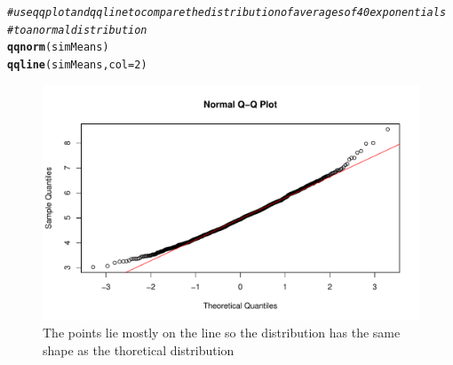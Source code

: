 \documentclass{article}\usepackage[]{graphicx}\usepackage[]{color}
\makeatletter
\def\maxwidth{ %
  \ifdim\Gin@nat@width>\linewidth
    \linewidth
  \else
    \Gin@nat@width
  \fi
}
\newcommand{\hlnum}[1]{\textcolor[rgb]{0.686,0.059,0.569}{#1}}%
\newcommand{\hlcom}[1]{\textcolor[rgb]{0.678,0.584,0.686}{\textit{#1}}}%
\newcommand{\hlstd}[1]{\textcolor[rgb]{0.345,0.345,0.345}{#1}}%
\newcommand{\hlkwc}[1]{\textcolor[rgb]{0.333,0.667,0.333}{#1}}%
\newcommand{\hlkwd}[1]{\textcolor[rgb]{0.737,0.353,0.396}{\textbf{#1}}}%
\newenvironment{kframe}{%
 \def\at@end@of@kframe{}%
 \ifinner\ifhmode%
  \def\at@end@of@kframe{\end{minipage}}%
  \begin{minipage}{\columnwidth}%
 \fi\fi%
 \def\FrameCommand##1{\hskip\@totalleftmargin \hskip-\fboxsep
 \colorbox{shadecolor}{##1}\hskip-\fboxsep
     \hskip-\linewidth \hskip-\@totalleftmargin \hskip\columnwidth}%
 \MakeFramed {\advance\hsize-\width
   \@totalleftmargin\z@ \linewidth\hsize
   \@setminipage}}%
 {\par\unskip\endMakeFramed%
 \at@end@of@kframe}
\newenvironment{knitrout}{}{} %
\makeatother
\begin{document}
\begin{knitrout}
\color{fgcolor}\begin{kframe}
\begin{alltt}
\hlcom{# use qqplot and qqline to compare the distribution of averages of 40 exponentials}
\hlcom{# to a normal distribution}
\hlkwd{qqnorm}\hlstd{(simMeans)}
\hlkwd{qqline}\hlstd{(simMeans,} \hlkwc{col} \hlstd{=} \hlnum{2}\hlstd{)}
\end{alltt}
\end{kframe}\begin{figure}
\includegraphics[width=\maxwidth]{figure/qqplot-1} \caption[The points lie mostly on the line so the distribution has the same shape as the thoretical distribution]{The points lie mostly on the line so the distribution has the same shape as the thoretical distribution}\label{fig:qqplot}
\end{figure}


\end{knitrout}

  
\end{document}
